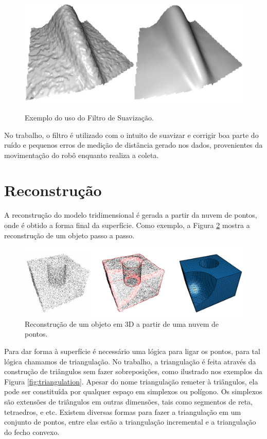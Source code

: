 \begin{figure}[H]
    \centering
    \caption{Exemplo do uso do Filtro de Suavização.}
    \includegraphics[scale=0.3]{dados/figuras/mls_filter.jpg}
    \label{fig:smoothing_filter}
\end{figure}

No trabalho, o filtro é utilizado com o intuito de suavizar e corrigir boa parte do ruído e pequenos erros de medição de distância gerado nos dados, provenientes da movimentação do robô enquanto realiza a coleta.

\section{Reconstrução}
\label{sec:reconstrucao}

A reconstrução do modelo tridimensional é gerada a partir da nuvem de pontos, onde é obtido a forma final da superfície. 
Como exemplo, a Figura \ref{fig:reconstruction} mostra a reconstrução de um objeto passo a passo.

\begin{figure}[H]
    \centering
    \caption{Reconstrução de um objeto em 3D a partir de uma nuvem de pontos.}
    \label{fig:reconstruction}
    \includegraphics[scale=0.8]{dados/figuras/reconstruction.png}
\end{figure}

Para dar forma à superfície é necessário uma lógica para ligar os pontos, para tal lógica chamamos de triangulação.
No trabalho, a triangulação é feita através da construção de triângulos sem fazer sobreposições, como ilustrado nos exemplos da Figura \ref{fig:triangulation}. 
Apesar do nome triangulação remeter à triângulos, ela pode ser constituída por qualquer espaço em simplexos ou polígono. 
Os simplexos são extensões de triângulos em outras dimensões, tais como segmentos de reta, tetraedros, e etc. 
Existem diversas formas para fazer a triangulação em um conjunto de pontos, entre elas estão a triangulação incremental e a triangulação do fecho convexo.

